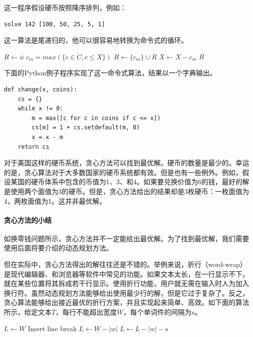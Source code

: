 \documentclass[b5paper]{ctexart}
\begin{document}
这一程序假设硬币按照降序排列，例如：

\lstset{language=Haskell}
\begin{lstlisting}[style=Haskell]
solve 142 [100, 50, 25, 5, 1]
\end{lstlisting}

这一算法是尾递归的，他可以很容易地转换为命令式的循环。

\begin{algorithmic}[1]
  \State $R \gets \phi$
    \State $c_m = max(\{c \in C, c \leq X\})$
    \State $R \gets \{c_m\} \cup R$
    \State $X \gets X - c_m$
  \EndWhile
  \State \Return $R$
\EndFunction
\end{algorithmic}

下面的Python例子程序实现了这一命令式算法，结果以一个字典输出。

\lstset{language=Python}
\begin{lstlisting}
def change(x, coins):
    cs = {}
    while x != 0:
        m = max([c for c in coins if c <= x])
        cs[m] = 1 + cs.setdefault(m, 0)
        x = x - m
    return cs
\end{lstlisting}

对于美国这样的硬币系统，贪心方法可以找到最优解。硬币的数量是最少的。幸运的是，贪心算法对于大多数国家的硬币系统都有效。但是也有一些例外。例如，假设某国的硬币体系中包含的币值为1、3、和4。如果要兑换价值为6的钱，最好的解是使用两个面值为3的硬币。但是，贪心方法给出的结果却是3枚硬币：一枚面值为4，两枚面值为1。这并非最优解。

\paragraph{贪心方法的小结}

如换零钱问题所示，贪心方法并不一定能给出最优解。为了找到最优解，我们需要使用后面将要介绍的动态规划方法。

但在实际中，贪心方法得出的解往往还是不错的。举例来说，折行（word-wrap）是现代编辑器、和浏览器等软件中常见的功能。如果文本太长，在一行显示不下，就在某些位置将其拆成若干行显示。使用折行功能，用户就无需在输入时人为加入换行符。虽然动态规划方法能够给出使用最少行的解，但是它过于复杂了。反之，贪心算法能够给出接近最优的折行方案，并且实现起来简单、高效。如下面的算法所示，给定文本$T$，每行不能超出宽度$W$，每个单词件的间隔为$s$。

\begin{algorithmic}[1]
\State $L \gets W$
    \State Insert line break
    \State $L \gets W - |w|$
  \Else
    \State $L \gets L - |w| - s$
  \EndIf
\EndFor
\end{algorithmic}
\end{document}
